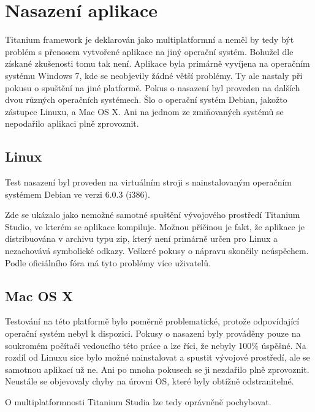 \chapter{Nasazení aplikace}

Titanium framework je deklarován jako multiplatformní a neměl by tedy být problém s přenosem vytvořené aplikace na jiný operační systém. Bohužel dle získané zkušenosti tomu tak není. Aplikace byla primárně vyvíjena na operačním systému Windows 7, kde se neobjevily žádné větší problémy. Ty ale nastaly při pokusu o spuštění na jiné platformě. Pokus o nasazení byl proveden na dalších dvou různých operačních systémech. Šlo o operační systém Debian\cite{debian}, jakožto zástupce Linuxu, a Mac OS X\cite{mac}. Ani na jednom ze zmiňovaných systémů se nepodařilo aplikaci plně zprovoznit. 

\section{Linux}
Test nasazení byl proveden na virtuálním stroji s nainstalovaným operačním systémem Debian ve verzi 6.0.3 (i386).

Zde se ukázalo jako nemožné samotné spuštění vývojového prostředí Titanium Studio, ve kterém se aplikace kompiluje. Možnou příčinou je fakt, že aplikace je distribuována v archivu typu zip, který není primárně určen pro Linux a nezachovává symbolické odkazy. Veškeré pokusy o nápravu skončily neúspěchem. Podle oficiálního fóra má tyto problémy více uživatelů.

\section{Mac OS X}

Testování na této platformě bylo poměrně problematické, protože odpovídající operační systém nebyl k dispozici. Pokusy o nasazení byly prováděny pouze na soukromém počítači vedoucího této práce a lze říci, že nebyly 100\% úspěšné. Na rozdíl od Linuxu sice bylo možné nainstalovat a spustit vývojové prostředí, ale se samotnou aplikací už ne. Ani po mnoha pokusech se ji nezdařilo plně zprovoznit. Neustále se objevovaly chyby na úrovni OS, které byly obtížně odstranitelné.

O multiplatformnosti Titanium Studia lze tedy oprávněně pochybovat.